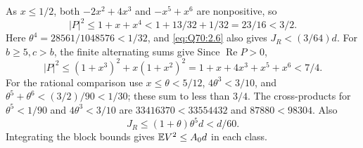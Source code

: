 As \(x\le\allowbreak 1/2\), both \(-2x^2+4x^3\) and \(-x^5+x^6\) are nonpositive,
so
\begin{equation}\tag{Q70.5.5}\label{eq:Q70:5.5}
|P|^2\le1+x+x^4<1+13/32+1/32=23/16<3/2.
\end{equation}
Here \(\theta^4=\allowbreak 28561/1048576<\allowbreak 1/32\), and
\eqref{eq:Q70:2.6} also gives \(J_R<\allowbreak (3/64)d\).
For \(b\ge\allowbreak 5,\allowbreak c>\allowbreak b\), the finite alternating sums give
Since \(\operatorname{Re}P>\allowbreak 0\),
\begin{equation}\tag{Q70.5.6}\label{eq:Q70:5.6}
|P|^2\le(1+x^3)^2+x(1+x^2)^2
=1+x+4x^3+x^5+x^6<7/4.
\end{equation}
For the rational comparison use \(x\le\allowbreak \theta<\allowbreak 5/12\),
\(4\theta^3<\allowbreak 3/10\), and
\(\theta^5+\theta^6<\allowbreak (3/2)/90<\allowbreak 1/30\); these sum to less than \(3/4\).
The cross-products for \(\theta^5<\allowbreak 1/90\) and \(4\theta^3<\allowbreak 3/10\)
are \(33416370<\allowbreak 33554432\) and \(87880<\allowbreak 98304\).
Also
\begin{equation}\tag{Q70.5.7}\label{eq:Q70:5.7}
J_R\le(1+\theta)\theta^5d<d/60.
\end{equation}
Integrating the block bounds gives \(\mathbb E V^2\le\allowbreak  A_0d\) in each class.

